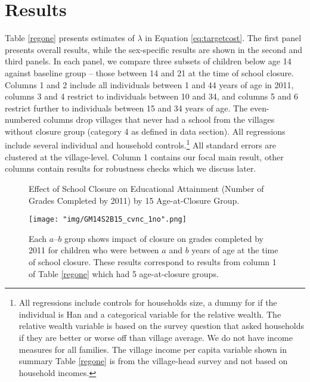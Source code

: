 \documentclass[12pt,english]{article}
\begin{document}
\section{Results}



Table \ref{regone} presents estimates of \(\lambda \) in Equation \ref{eq:targetcost}. The first panel presents overall results, while the sex-specific results are shown in the second and third panels. In each panel, we compare three subsets of children below age 14 against baseline group -- those between 14 and 21 at the time of school closure. Columns 1 and 2 include all individuals between 1 and 44 years of age in 2011, columns 3 and 4 restrict to individuals between 10 and 34, and columns 5 and 6 restrict further to individuals between 15 and 34 years of age. The even-numbered columns drop villages that never had a school from the villages without closure group (category 4 as defined in data section). All regressions include several individual and household controls.\footnote{All regressions include controls for households size, a dummy for if the individual is Han and a categorical variable for the relative wealth. The relative wealth variable is based on the survey question that asked households if they are better or worse off than village average. We do not have income measures for all families. The village income per capita variable shown in summary Table \ref{regone} is from the village-head survey and not based on household incomes.} All standard errors are clustered at the village-level. Column 1 contains our focal main result, other columns contain results for robustness checks which we discuss later.

\begin{figure}[h]
	\centering
	\caption{\small Effect of School Closure on Educational Attainment (Number of Grades Completed by 2011) by 15 Age-at-Closure Group.}
	\texttt{[image: "img/GM14S2B15\_cvnc\_1no".png]}
	\captionsetup{width=1.0\textwidth}
	\caption*{\footnotesize Each $a$--$b$ group shows impact of closure on grades completed by 2011 for children who were between $a$ and $b$ years of age at the time of school closure. These results correspond to results from column 1 of Table \ref{regone} which had 5 age-at-closure groups. \label{figoneb}}
\end{figure}
\end{document}
